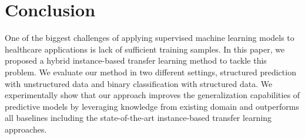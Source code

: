 \documentclass{article}
\begin{document}
\begin{figure}[htbp]
\vspace{-.2cm}
\begin{floatrow}
\end{floatrow}
\vspace{-.35cm}
\end{figure}

\section{Conclusion}
\vspace{-.2cm}
\label{sec:conclusion}
One of the biggest challenges of applying supervised machine learning models to healthcare applications is lack of sufficient training samples. In this paper, we proposed a hybrid instance-based transfer learning method to tackle this problem. We evaluate our method in two different settings, structured prediction with unstructured data and binary classification with structured data. We experimentally show that our approach improves the generalization capabilities of predictive models by leveraging knowledge from existing domain and outperforms all baselines including the state-of-the-art instance-based transfer learning approaches.
\small
\end{document}
